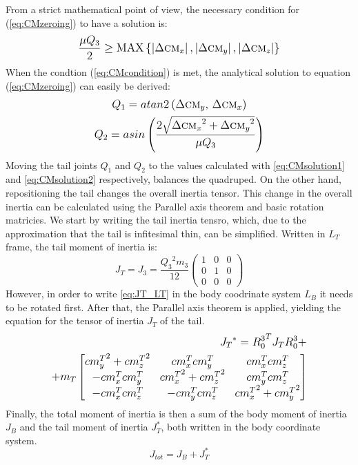 From a strict mathematical point of view, the necessary condition for (\ref{eq:CMzeroing}) to have a solution is:
\begin{equation}\label{eq:CMcondition}
\frac{\mu Q_3}{2}\geq \textup{MAX}\left \{ \left | \Delta \textsc{cm}_x \right |, \left | \Delta \textsc{cm}_y \right |,\left | \Delta \textsc{cm}_z \right |\right \}
\end{equation}
When the condtion (\ref{eq:CMcondition}) is met, the analytical solution to equation (\ref{eq:CMzeroing}) can easily be derived:
\begin{gather}\label{eq:CMsolution1}
Q_1=atan2\left({\Delta \textsc{cm}_y},\, {\Delta \textsc{cm}_x}\right)\\
Q_2=asin\left(\frac{2\sqrt{{\Delta \textsc{cm}_x}^2+{\Delta \textsc{cm}_y}^2}}{\mu Q_3} \right)\label{eq:CMsolution2}
\end{gather}
Moving the tail joints $Q_1$ and $Q_2$ to the values calculated with \eqref{eq:CMsolution1} and \eqref{eq:CMsolution2} respectively, balances the quadruped. On the other hand, repositioning the tail changes the overall inertia tensor. This change in the overall inertia can be calculated using the Parallel axis theorem and basic rotation matricies. We start by writing the tail inertia tensro, which, due to the approximation that the tail is infitesimal thin, can be simplified. Written in $L_T$ frame, the tail moment of inertia is:
\begin{equation}\label{eq:JT_LT}
J_T=J_3=\frac{{Q_3}^2 m_3}{12}\left(
\begin{array}{ccc}
 1 & 0 & 0 \\
 0 & 1 & 0 \\
 0 & 0 & 0
\end{array}
\right)
\end{equation}
However, in order to write \eqref{eq:JT_LT} in the body coodrinate system $L_B$ it needs to be rotated first. After that, the Parallel axis theorem is applied, yielding the equation for the tensor of inertia $J_T$ of the tail. 
\begin{equation}
\begin{aligned}
\scriptsize
{J_T}^*={R_0^3}^TJ_TR_0^3+\\+m_T\begin{bmatrix}
{cm_y^T}^2 +{cm_z^T}^2& {cm_x^T}{cm_y^T}& {cm_x^T}{cm_z^T} \\ 
-{cm_x^T}{cm_y^T} & {cm_x^T}^2+{cm_z^T}^2 & {cm_y^T}{cm_z^T}\\ 
-{cm_x^T}{cm_z^T} & -{cm_y^T}{cm_z^T} & {cm_x^T}^2+{cm_y^T}^2
\end{bmatrix}
\normalsize
\end{aligned}
\end{equation}
Finally, the total moment of inertia is then a sum of the body moment of inertia $J_B$ and the tail moment of inertia $J_T^*$, both written in the body coordinate system.
\begin{equation*}
J_{tot}=J_B+J_T^*
\end{equation*}
